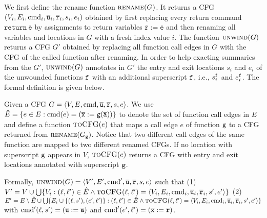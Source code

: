 We first define the rename function $\textsc{rename}(G)$. It returns a CFG $(V_i, E_i,\textmd{cmd}_i, \overline{\texttt{u}}_i, \overline{\texttt{r}}_i,s_i,e_i)$ obtained by first replacing every return command $\mathtt{return}\ \overline{\texttt{e}}$ by assignments to return variables $\overline{\texttt{r}} := \overline{\texttt{e}}$ and then renaming all variables and locations in $G$ with a fresh index value $i$. The function $\textsc{unwind}(G)$ returns a CFG $G'$ obtained by replacing all function call edges in $G$ with the CFG of the called function after renaming. In order to help exacting summaries from the $G'$, $\textsc{unwind}(G)$ annotates in $G'$ the entry and exit locations ${s_i}$ and ${e_i}$ of the unwounded functions $\mathtt{{f}}$ with an additional superscript $\mathtt{{f}}$, i.e., $s_i^{\mathtt{{f}}}$ and $e_i^{\mathtt{{f}}}$. The formal definition is given below.

Given a CFG $G=\langle
V, E,\textmd{cmd}, \overline{\texttt{u}}, \overline{\texttt{r}},s,e \rangle$.
We use $\hat{E} =\{e\in E: \textmd{cmd} (e)= (\overline{\texttt{x}}:=\mathtt{g}(\overline{\texttt{a}}))\}$ to denote the set of function call edges in $E$ and define a function $\textsc{toCFG}(e)$ that maps a call edge $e$ of function $\mathtt{{g}}$ to a CFG returned from $\textsc{rename}(G_{\mathtt{{g}}})$. Notice that two different call edges of the same function are mapped to two different renamed CFGs. If no location with superscript $\mathtt{{g}}$ appears in $V$, $\textsc{toCFG}(e)$ returns a CFG with entry and exit locations annotated with superscript $\mathtt{{g}}$.

Formally, $\textsc{unwind}(G) = \langle V', E',\textmd{cmd}', \overline{\texttt{u}}, \overline{\texttt{r}},s,e \rangle$ such that (1) $V' = V\cup \bigcup\{V_i:(\ell, \ell')\in \hat{E} \wedge \textsc{toCFG}(\ell, \ell')= \langle V_i, E_i,\textmd{cmd}_i, \overline{\texttt{u}}_i, \overline{\texttt{r}}_i,s',e'\rangle \}$ (2) $E'= E \setminus \hat{E} \cup \bigcup\{E_i\cup\{(\ell, s'),(e', \ell')\}: (\ell, \ell')\in \hat{E} \wedge \textsc{toCFG}(\ell, \ell')= \langle V_i, E_i,\textmd{cmd}_i, \overline{\texttt{u}}_i, \overline{\texttt{r}}_i,s',e'\rangle \}$ with $\textmd{cmd}' (\ell, s') = (\overline{\texttt{u}}:=\overline{\texttt{a}})$ and $\textmd{cmd}' (e', \ell') = (\overline{\texttt{x}}:=\overline{\texttt{r}})$.



